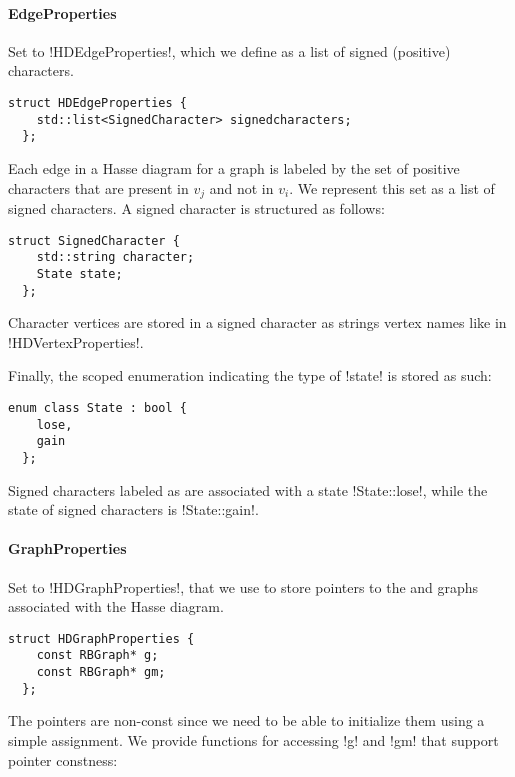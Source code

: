 \paragraph{EdgeProperties}

Set to !HDEdgeProperties!, which we define as a list of signed (positive) characters.

\begin{lstlisting}[moreemph={SignedCharacter}]
  struct HDEdgeProperties {
    std::list<SignedCharacter> signedcharacters;
  };
\end{lstlisting}

Each edge  in a Hasse diagram for a graph \gm{} is labeled by the set of positive characters that are present in $v_{j}$ and not in $v_{i}$.
We represent this set as a list of signed characters.
A signed character is structured as follows:

\begin{lstlisting}[belowskip=0pt, moreemph={State}]
  struct SignedCharacter {
    std::string character;
    State state;
  };
\end{lstlisting}

Character vertices are stored in a signed character as strings \textendash{} vertex names \textendash{} like in !HDVertexProperties!.

Finally, the scoped enumeration indicating the type of !state! is stored as such:

\begin{lstlisting}[belowskip=0pt]
  enum class State : bool {
    lose,
    gain
  };
\end{lstlisting}

Signed characters labeled as \character[][-] are associated with a state !State::lose!, while the state of signed characters \character[][+] is !State::gain!.

\paragraph{GraphProperties}

Set to !HDGraphProperties!, that we use to store pointers to the \grb{} and \gm{} graphs associated with the Hasse diagram.

\begin{lstlisting}[moreemph={RBGraph}]
  struct HDGraphProperties {
    const RBGraph* g;
    const RBGraph* gm;
  };
\end{lstlisting}

The pointers are non-const since we need to be able to initialize them using a simple assignment.
We provide functions for accessing !g! and !gm! that support pointer constness:

